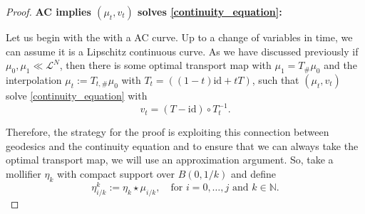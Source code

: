 \begin{proof}
	{\bf AC implies $(\mu_t, v_t)$ solves \eqref{continuity_equation}:}
	
	Let us begin with the with a AC curve. Up to a change of variables in time, we can assume it is a Lipschitz continuous curve. As we have discussed previously if $\mu_0, \mu_1 \ll \mathcal{L}^N$, then there is some optimal transport map with $\mu_1 = T_{\#}\mu_0$ and the interpolation $\mu_t := T_{t,\#}\mu_0$ with $T_t = ((1-t)\text{id} + tT)$, such that $(\mu_t, v_t)$ solve \eqref{continuity_equation} with 
	$$
		v_t = (T-\text{id})\circ T_t^{-1}.
	$$
	
	Therefore, the strategy for the proof is exploiting this connection between geodesics and the continuity equation and to ensure that we can always take the optimal transport map, we will use an approximation argument. So, take a {mollifier} $\eta_k$ with compact support over $B(0,1/k)$ and define 
	$$
		\eta^k_{i/k} := \eta_k\star \mu_{i/k}, \quad \text{for $i=0,\dots, j$ and $k \in \mathbb{N}$.}
	$$
	

\end{proof}

